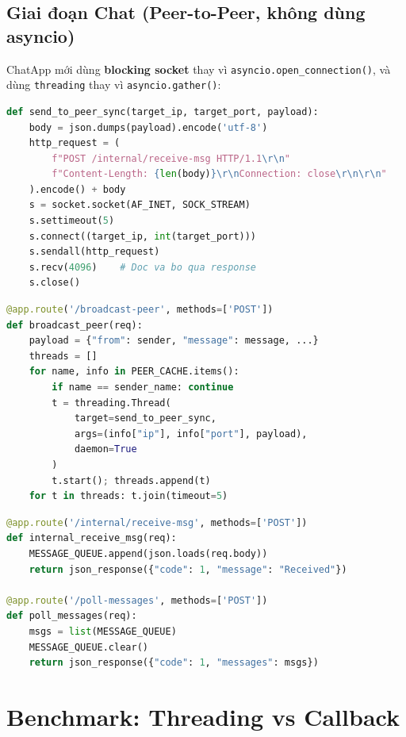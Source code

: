 \documentclass[12pt,a4paper]{article}
\begin{document}
\subsection{Giai đoạn Chat (Peer-to-Peer, không dùng asyncio)}

ChatApp mới dùng \textbf{blocking socket} thay vì \texttt{asyncio.open\_connection()}, và dùng \texttt{threading} thay vì \texttt{asyncio.gather()}:

\begin{lstlisting}[language=Python, caption={send\_to\_peer\_sync() --- gui P2P bang blocking socket}]
def send_to_peer_sync(target_ip, target_port, payload):
    body = json.dumps(payload).encode('utf-8')
    http_request = (
        f"POST /internal/receive-msg HTTP/1.1\r\n"
        f"Content-Length: {len(body)}\r\nConnection: close\r\n\r\n"
    ).encode() + body
    s = socket.socket(AF_INET, SOCK_STREAM)
    s.settimeout(5)
    s.connect((target_ip, int(target_port)))
    s.sendall(http_request)
    s.recv(4096)    # Doc va bo qua response
    s.close()
\end{lstlisting}

\begin{lstlisting}[language=Python, caption={broadcast\_peer() --- gui dong thoi bang threading}]
@app.route('/broadcast-peer', methods=['POST'])
def broadcast_peer(req):
    payload = {"from": sender, "message": message, ...}
    threads = []
    for name, info in PEER_CACHE.items():
        if name == sender_name: continue
        t = threading.Thread(
            target=send_to_peer_sync,
            args=(info["ip"], info["port"], payload),
            daemon=True
        )
        t.start(); threads.append(t)
    for t in threads: t.join(timeout=5)
\end{lstlisting}

\begin{lstlisting}[language=Python, caption={Nhan va lay tin nhan}]
@app.route('/internal/receive-msg', methods=['POST'])
def internal_receive_msg(req):
    MESSAGE_QUEUE.append(json.loads(req.body))
    return json_response({"code": 1, "message": "Received"})

@app.route('/poll-messages', methods=['POST'])
def poll_messages(req):
    msgs = list(MESSAGE_QUEUE)
    MESSAGE_QUEUE.clear()
    return json_response({"code": 1, "messages": msgs})
\end{lstlisting}

\section{Benchmark: Threading vs Callback}
\end{document}
